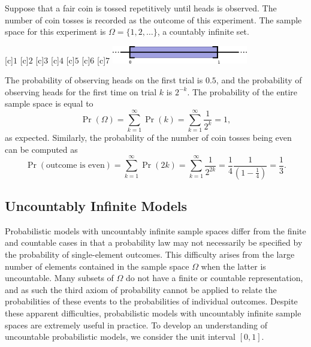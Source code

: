 \begin{example} \label{example:CoinTossSequence}
Suppose that a fair coin is tossed repetitively until heads is observed.
The number of coin tosses is recorded as the outcome of this experiment.
The sample space for this experiment is $\Omega = \{ 1, 2, \ldots \}$, a countably infinite set.

\begin{center}
\begin{psfrags}
[c]{$1$}
[c]{$2$}
[c]{$3$}
[c]{$4$}
[c]{$5$}
[c]{$6$}
[c]{$7$}
\includegraphics[height=0.765cm]{Figures/2Chapter/countablespace}
\end{psfrags}
\end{center}

The probability of observing heads on the first trial is $0.5$, and the probability of observing heads for the first time on trial $k$ is $2^{-k}$.
The probability of the entire sample space is equal to
\begin{equation*}
\Pr ( \Omega ) = \sum_{k=1}^{\infty} \Pr (k)
= \sum_{k=1}^{\infty} \frac{1}{2^k} = 1 ,
\end{equation*}
as expected.
Similarly, the probability of the number of coin tosses being even can be computed as
\begin{equation*}
\Pr ( \text{outcome is even} )
= \sum_{k=1}^{\infty} \Pr (2k)
= \sum_{k = 1}^{\infty} \frac{1}{2^{2k}}
= \frac{1}{4} \frac{1}{ \left( 1 - \frac{1}{4} \right) }
= \frac{1}{3} .
\end{equation*}
\end{example}


\subsection{Uncountably Infinite Models}

Probabilistic models with uncountably infinite sample spaces differ from the finite and countable cases in that a probability law may not necessarily be specified by the probability of single-element outcomes.
This difficulty arises from the large number of elements contained in the sample space $\Omega$ when the latter is uncountable.
Many subsets of $\Omega$ do not have a finite or countable representation, and as such the third axiom of probability cannot be applied to relate the probabilities of these events to the probabilities of individual outcomes.
Despite these apparent difficulties, probabilistic models with uncountably infinite sample spaces are extremely useful in practice.
To develop an understanding of uncountable probabilistic models, we consider the unit interval $[0, 1]$.

